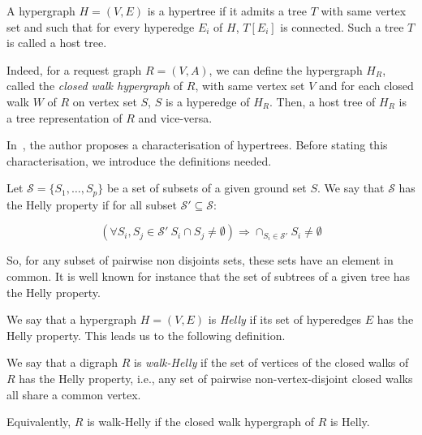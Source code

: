\documentclass[11pt]{article}%
\begin{document}
\begin{definition}[Hypertree]
A hypergraph $H=(V,E)$ is a hypertree if it admits a tree $T$ with same vertex set and such that for every hyperedge $E_i$ of $H$, $T[E_i]$ is connected. Such a tree $T$ is called a host tree. 
\end{definition}

Indeed, for a request graph $R=(V,A)$, we can define the hypergraph $H_R$, called the {\it closed walk hypergraph} of $R$, with same vertex set $V$ and for each closed walk $W$ of $R$ on vertex set $S$, $S$ is a hyperedge of $H_R$. Then, a host tree of $H_R$ is a tree representation of $R$ and vice-versa. 

In~\cite{flament1978}, the author proposes a characterisation of hypertrees. Before stating this characterisation, we introduce the definitions needed. 

    \begin{definition}
        Let $\mathcal{S}=\{S_1,\dots,S_p\}$ be a set of subsets of a given ground set $S$. We say that $\mathcal{S}$ has the Helly property if for all subset $\mathcal{S}'\subseteq \mathcal{S}$:
        
        $$\left( \forall S_i,S_j \in \mathcal{S}' \ S_i\cap S_j\neq \emptyset \right) \Longrightarrow \cap_{S_i\in \mathcal{S}'} S_i \neq \emptyset$$ 
    \end{definition}
    So, for any subset of pairwise non disjoints sets, these sets have an element in common. It is well known for instance that the set of subtrees of a given tree has the Helly property.  
    
    We say that a hypergraph $H=(V,E)$ is {\it Helly} if its set of hyperedges $E$ has the Helly property. This leads us to the following definition. 
    \begin{definition}
    We say that a digraph $R$ is {\it walk-Helly} if the set of vertices of the closed walks of $R$ has the Helly property, i.e., any set of pairwise non-vertex-disjoint closed walks all share a common vertex. 
    \end{definition} 
    Equivalently, $R$ is walk-Helly if the closed walk hypergraph of $R$ is Helly.
    
\end{document}
